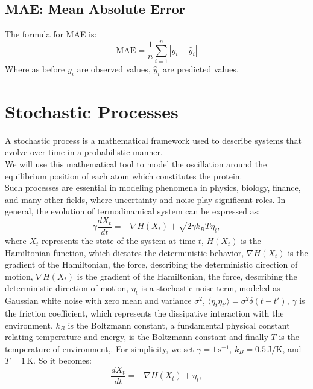 \documentclass[English, Lau, oneside]{sapthesis}
\begin{document}
\subsection{MAE: Mean Absolute Error}
\noindent The formula for MAE is:
\[
\text{MAE} = \frac{1}{n} \sum_{i=1}^n |y_i - \hat{y}_i|
\]
Where as before \(y_i\) are observed values, \(\hat{y}_i\) are predicted values.


\newpage

\section{Stochastic Processes}  \label{sec:stochastic_processes}
A stochastic process is a mathematical framework used to describe systems that evolve over time in a probabilistic manner.\\
We will use this mathematical tool to model the oscillation around the equilibrium position of each atom which constitutes the protein.\\
Such processes are essential in modeling phenomena in physics, biology, finance, and many other fields, where uncertainty and noise play significant roles.
In general, the evolution of termodinamical system can be expressed as:
\begin{equation}
    \gamma\frac{dX_t}{dt} = -\nabla H(X_t) + \sqrt{2 \gamma k_B T} \eta_t,
\end{equation}
where \( X_t \) represents the state of the system at time \( t \), \( H(X_t) \) is the Hamiltonian function, which dictates the deterministic behavior, \( \nabla H(X_t) \) is the gradient of the Hamiltonian, the force, describing the deterministic direction of motion, \( \nabla H(X_t) \) is the gradient of the Hamiltonian, the force, describing the deterministic direction of motion, \( \eta_t \) is a stochastic noise term, modeled as Gaussian white noise with zero mean and variance \( \sigma^2 \),  \( \langle \eta_t \eta_{t'} \rangle = \sigma^2 \delta(t-t') \), \( \gamma \) is the friction coefficient, which represents the dissipative interaction with the environment, \( k_B \) is the Boltzmann constant, a fundamental physical constant relating temperature and energy, is the Boltzmann constant and finally \( T \) is the temperature of environment,.
For simplicity, we set \( \gamma = 1 \, \text{s}^{-1} \), \( k_B = 0.5 \, \text{J/K} \), and \( T = 1 \, \text{K} \).
So it becomes:
\begin{equation}
    \frac{dX_t}{dt} = -\nabla H(X_t) + \eta_t,
\end{equation}
\end{document}
